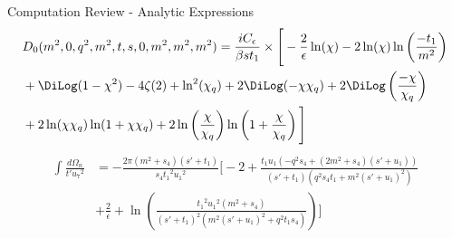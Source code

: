 \begin{frame}[<+->]{Computation Review - Analytic Expressions}
\small
\begin{align*}
\nonumber
&D_0(m^2,0,q^2,m^2,t,s,0,m^2,m^2,m^2) = \frac{i C_\epsilon}{\beta s t_1}\times \Bigg[ -\frac{2}{\epsilon} \ln(\chi) -2\ln(\chi)\ln\left(\frac{-t_1}{m^2}\right)\\
\nonumber
&+\DiLog(1-\chi^2)-4\zeta(2)+\ln^2(\chi_q) + 2\DiLog(-\chi\chi_q)+2\DiLog\left(\frac{-\chi}{\chi_q}\right)\\
&+2\ln(\chi\chi_q) \ln(1+\chi\chi_q)+2\ln\left(\frac{\chi}{\chi_q}\right)\ln\left(1+\frac{\chi}{\chi_q}\right) \Bigg]
\end{align*}
\noindent\makebox[\linewidth]{\color{UniRot}\rule{\paperwidth}{0.4pt}}
\begin{align*}
\nonumber
\int\!\! \frac{d\Omega_n}{t' {u_7}^2} &= -\frac{2 \pi  (m^2+s_4) ({s'}+{t_1}) }{s_4 {t_1}^2 {u_1}^2} \Bigg[-2+\frac{{t_1} {u_1} (-q^2 s_4+(2 m^2+s_4) ({s'}+{u_1}))}{({s'}+{t_1}) \left(q^2 s_4 {t_1}+m^2 ({s'}+{u_1})^2\right)}\nonumber\\
 & +\frac{2}{\epsilon }+\ln\left(\frac{{t_1}^2 {u_1}^2 ({m^2}+{s_4})}{({s'}+{t_1})^2 \left({m^2} ({s'}+{u_1})^2+{q^2} {t_1} {s_4}\right)}\right)\Bigg]
\end{align*}\pause
{}
\end{frame}
